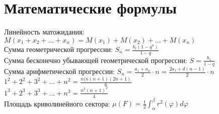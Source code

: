 \documentclass{article}
\begin{document}
\section*{Математические формулы}
Линейность матожидания: $M(x_1 + x_2 + \dots + x_n) = M(x_1) + M(x_2) + \dots + M(x_n)$ \\
Сумма геометрической прогрессии: $S_n = \frac{b_1 (1 - q^n)}{1 - q}$ \\
Сумма бесконечно убывающей геометрической прогрессии: $S = \frac{b_1}{1 - q}$ \\
Сумма арифметической прогрессии: $S_n = \frac{a_1 + a_n}{2} \cdot n = \frac{2a_1 + d(n - 1)}{2} \cdot n$ \\
$1^2 + 2^2 + 3^2 + \dots + n^2 = \frac{n(n(n + 1)(2n + 1)}{6}$ \\
$1^3 + 2^3 + 3^3 + \dots + n^3 = \frac{n^2 (n + 1)^2}{4}$ \\
Площадь криволинейного сектора: $\mu(F) = \frac{1}{2} \int_{\alpha}^{\beta} r^2(\varphi) d\varphi$ \\
\end{document}
